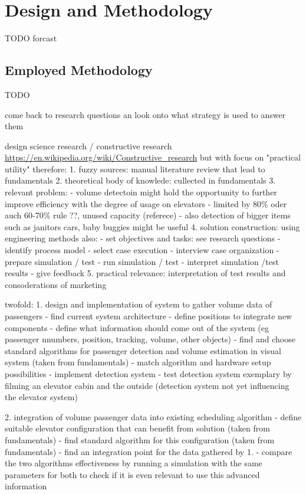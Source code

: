 \chapter{Design and Methodology}
\label{chap:design}
TODO forcast



\section{Employed Methodology}
TODO




come back to research questions an look onto what strategy is used to answer them

design science research / constructive research
\url{https://en.wikipedia.org/wiki/Constructive_research}
but with focus on "practical utility"
therefore:
1. fuzzy sources: manual literature review that lead to fundamentals
2. theoretical body of knowlede: cullected in fundamentals
3. relevant problem: 
    - volume detectoin might hold the opportunity to further improve efficiency with the degree of usage on elevators
    - limited by 80\% oder auch 60-70\% rule \autocite[][p.~194]{unger2015aufzuege} ??, unused capacity (referece)
    - also detection of bigger items such as janitors cars, baby buggies  might be useful
4. solution construction: using engineering methods
    also:    
    - set objectives and tasks: see research questions
    - identify process model
    - select case execution
    - interview case organization
    - prepare simulation / test
    - run simulation / test
    - interpret simulation /test results
    - give feedback
5. practical relevance: interpretation of test results and consoderations of marketing 



twofold:
1. design and implementation of system to gather volume data of passengers
 - find current system architecture
 - define positions to integrate new components
 - define what information should come out of the system
 (eg passenger nnumbers, position, tracking, volume, other objects)
 - find and choose standard algorithms for passenger detection and volume estimation in visual system (taken from fundamentals)
 - match algorithm and hardware setup possibilities
 - implement detection system
 - test detection system exemplary by filming an elevator cabin and the outside (detection system not yet influencing the elevator system)
 
2. integration of volume passenger data into existing scheduling algorithm
 - define suitable elevator configuration that can benefit from solution (taken from fundamentals) 
 - find standard algorithm for this configuration (taken from fundamentals)
 - find an integration point for the data gathered by 1.
 - compare the two algorithms effectiveness by running a simulation with the same parameters for both to check if it is even relevant to use this advanced information

